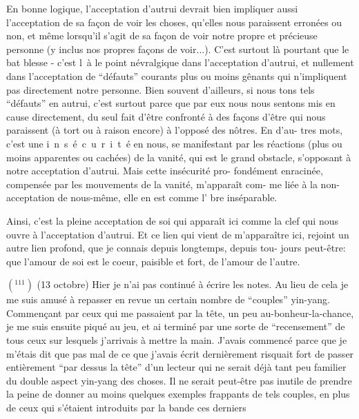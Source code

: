 En bonne logique, l'acceptation d'autrui devrait bien impliquer aussi
l'acceptation de sa façon de voir les choses, qu'elles nous paraissent erronées
ou non, et même lorsqu'il s'agit de sa façon de voir notre propre et précieuse
personne (y inclus nos propres façons de voir...). C'est surtout là pourtant que
le bat blesse - c'est \mbox{l à} le point névralgique dans l'acceptation d'autrui,
et nullement dans l'acceptation de ``défauts'' courants plus ou moins gênants qui
n'impliquent pas directement notre personne. Bien souvent d'ailleurs, si nous \linebreak
tons tels ``défauts'' en autrui, c'est surtout parce que par eux nous nous sentons
mis en cause directement, du seul fait d'être confronté à des façons d'être
qui nous paraissent (à tort ou à raison encore) à l'opposé des nôtres. En d'au-\linebreak
tres mots, c'est une \mbox{i n s é c u r i t é} en nous, se manifestant par les
réactions (plus ou moins apparentes ou cachées) de la vanité, qui est le grand
obstacle, s'opposant à notre acceptation d'autrui. Mais cette insécurité pro-\linebreak
fondément enracinée, compensée par les mouvements de la vanité, m'apparaît com-\linebreak
me  liée à la non-acceptation de nous-même, elle en est comme l'\linebreak
bre inséparable.

Ainsi, c'est la pleine acceptation de soi qui apparaît ici comme la clef
qui nous ouvre à l'acceptation d'autrui. Et ce lien qui vient de m'apparaître
ici, rejoint un autre lien profond, que je connais depuis longtemps, depuis tou-\linebreak
jours peut-être: que l'amour de soi est le coeur, paisible et fort, de l'amour
de l'autre.

\(({}^{111})\) (13 octobre) Hier je n'ai pas continué à écrire les notes. Au lieu de cela
je me suis amusé à repasser en revue un certain nombre de ``couples'' yin-yang.\unsure{\inserted{:}}
Commençant par ceux qui me passaient par la tête, un peu au-bonheur-la-chance,
je me suis ensuite piqué au jeu, et ai terminé par une sorte de ``recensement'' de
tous ceux sur lesquels j'arrivais à mettre la main. J'avais commencé parce que
je m'étais dit que pas mal de ce que j'avais écrit dernièrement risquait fort de
passer entièrement ``par dessus la tête'' d'un lecteur qui ne serait déjà tant 
peu familier du double aspect yin-yang des choses. Il ne serait peut-être pas
inutile de prendre la peine de donner au moins quelques exemples frappants de
tels couples, en plus de ceux qui s'étaient introduits par la bande ces derniers
\margin{\unsure{-}}

